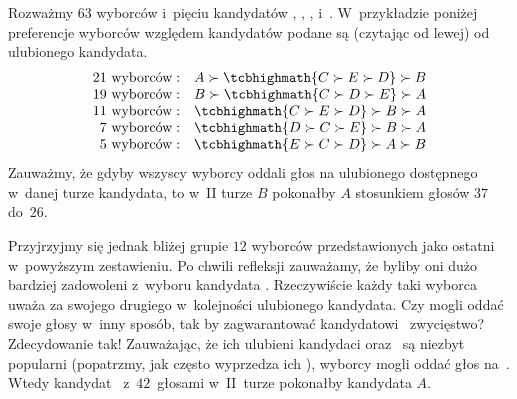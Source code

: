 Rozważmy $63$ wyborców i~pięciu kandydatów , , ,  i~. W~przykładzie poniżej preferencje wyborców względem kandydatów podane są (czytając od lewej) od ulubionego kandydata. 
$$\jot0pt\begin{aligned}
  21\text{ wyborców}:& \quad %
  A \succ \tcbhighmath{C \succ E \succ D} \succ B\\
  19\text{ wyborców}:& \quad %
  B \succ \tcbhighmath{C \succ D \succ E} \succ A\\
  11\text{ wyborców}:& \quad %
  \tcbhighmath{C \succ E \succ D} \succ B \succ A\\
  7\text{ wyborców}:& \quad %
  \tcbhighmath{D \succ C \succ E} \succ B \succ A\\
  5\text{ wyborców}:& \quad %
        \tcbhighmath{E \succ C \succ D} \succ A \succ B 
\end{aligned}$$
Zauważmy, że gdyby wszyscy wyborcy oddali głos na ulubionego dostępnego w~danej turze kandydata,
to w~II turze $B$ pokonałby $A$ stosunkiem głosów $37$ do~$26$.

Przyjrzyjmy się jednak bliżej grupie $12$ wyborców przedstawionych jako ostatni w~powyższym zestawieniu. 
Po chwili refleksji zauważamy, że byliby oni dużo bardziej zadowoleni z~wyboru kandydata .
Rzeczywiście każdy taki wyborca uważa  za swojego drugiego w~kolejności ulubionego kandydata.
Czy mogli oddać swoje głosy w~inny sposób, tak by zagwarantować kandydatowi~ zwycięstwo? Zdecydowanie tak!
Zauważając, że ich ulubieni kandydaci  oraz~ są niezbyt popularni (popatrzmy, jak często wyprzedza
ich ), wyborcy mogli oddać głos na~.
Wtedy kandydat~ z~$42$~głosami w~II~turze pokonałby kandydata $A$.

